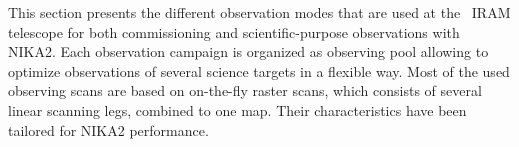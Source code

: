 

This section presents the different observation modes that are used at
the \trentemetre\ IRAM telescope for both commissioning and
scientific-purpose observations with NIKA2. {\lp Each observation
campaign is organized as observing pool allowing to optimize
observations of several science targets in a flexible way.}
Most of the used observing scans are based on on-the-fly raster scans,
which consists of several linear scanning legs, combined to one
map. Their characteristics have been tailored for NIKA2 performance.



